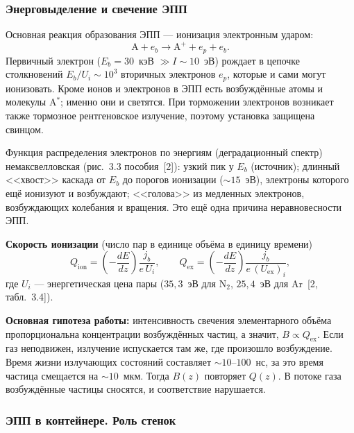 \documentclass[12pt,a4paper]{article}
\newcommand{\Nt}{\mathrm{N_2}}
\begin{document}
\subsubsection{Энерговыделение и свечение ЭПП}
\label{sec:edep}

Основная реакция образования ЭПП --- ионизация электронным ударом:
\begin{equation}
    \mathrm{A} + e_b \to \mathrm{A}^+ + e_p + e_b .
\end{equation}
Первичный электрон ($E_b = 30$~кэВ $\gg I \sim 10$~эВ) рождает в цепочке
столкновений $E_b/U_i \sim 10^3$ вторичных электронов $e_p$, которые и
сами могут ионизовать. Кроме ионов и электронов в ЭПП есть возбуждённые
атомы и молекулы A$^*$; именно они и светятся. При торможении электронов возникает также
тормозное рентгеновское излучение, поэтому установка защищена свинцом.

Функция распределения электронов по энергиям (деградационный спектр)
немаксвелловская (рис.~3.3 пособия~[2]): узкий пик у $E_b$ (источник);
длинный <<хвост>> каскада от $E_b$ до порогов ионизации ($\sim 15$~эВ),
электроны которого ещё ионизуют и возбуждают; <<голова>> из медленных
электронов, возбуждающих колебания и вращения. Это ещё одна причина
неравновесности ЭПП.

\textbf{Скорость ионизации} (число пар в единице объёма в единицу
времени)
\begin{equation}
    Q_\text{ion} = \left(-\frac{dE}{dz}\right)\frac{j_b}{e\,U_i},
    \qquad
    Q_\text{ex} = \left(-\frac{dE}{dz}\right)\frac{j_b}{e\,(U_\text{ex})_i},
    \label{eq:Q}
\end{equation}
где $U_i$ --- энергетическая цена пары ($35{,}3$~эВ для $\Nt$, $25{,}4$~эВ
для Ar~[2, табл.~3.4]).

\textbf{Основная гипотеза работы:} интенсивность свечения элементарного
объёма пропорциональна концентрации возбуждённых частиц, а значит,
$B \propto Q_\text{ex}$. Если газ неподвижен, излучение испускается там же,
где произошло возбуждение. Время жизни излучающих состояний составляет
$\sim 10$--$100$~нс, за это время частица смещается на $\sim 10$~мкм.
Тогда $B(z)$ повторяет $Q(z)$. В потоке газа возбуждённые частицы
сносятся, и соответствие нарушается.

\subsubsection{ЭПП в контейнере. Роль стенок}\label{sec:wall}
\end{document}

